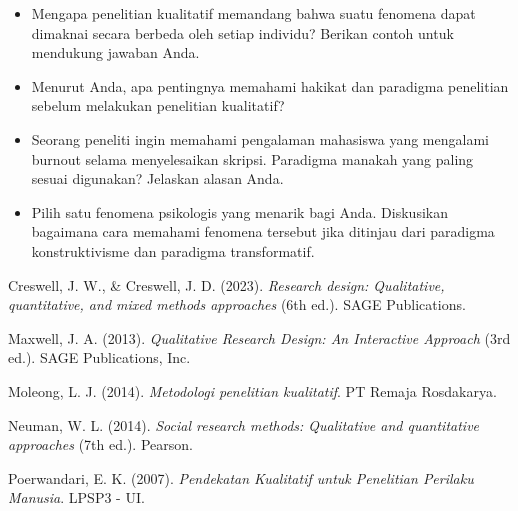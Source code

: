 \documentclass[
  indonesian,
  letterpaper,
  DIV=11,
  numbers=noendperiod]{scrreprt}
\newlength{\cslhangindent}
\newenvironment{CSLReferences}[2] %
 {\begin{list}{}{%
  \setlength{\itemindent}{0pt}
  \setlength{\leftmargin}{0pt}
  \setlength{\parsep}{0pt}
  \ifodd #1
   \setlength{\leftmargin}{\cslhangindent}
   \setlength{\itemindent}{-1\cslhangindent}
  \fi
  \setlength{\itemsep}{#2\baselineskip}}}
 {\end{list}}
\providecommand{\tightlist}{%
  \setlength{\itemsep}{0pt}\setlength{\parskip}{0pt}}
\begin{document}
\begin{tcolorbox}[enhanced jigsaw, colframe=quarto-callout-important-color-frame, toptitle=1mm, breakable, leftrule=.75mm, arc=.35mm, toprule=.15mm, colback=white, colbacktitle=quarto-callout-important-color!10!white, bottomtitle=1mm, bottomrule=.15mm, titlerule=0mm, title=\textcolor{quarto-callout-important-color}{\faExclamation}\hspace{0.5em}{Refleksi \& Diskusi}, coltitle=black, left=2mm, opacitybacktitle=0.6, opacityback=0, rightrule=.15mm]

\begin{itemize}
\tightlist
\item
  Mengapa penelitian kualitatif memandang bahwa suatu fenomena dapat
  dimaknai secara berbeda oleh setiap individu? Berikan contoh untuk
  mendukung jawaban Anda.
\item
  Menurut Anda, apa pentingnya memahami hakikat dan paradigma penelitian
  sebelum melakukan penelitian kualitatif?
\item
  Seorang peneliti ingin memahami pengalaman mahasiswa yang mengalami
  burnout selama menyelesaikan skripsi. Paradigma manakah yang paling
  sesuai digunakan? Jelaskan alasan Anda.
\item
  Pilih satu fenomena psikologis yang menarik bagi Anda. Diskusikan
  bagaimana cara memahami fenomena tersebut jika ditinjau dari paradigma
  konstruktivisme dan paradigma transformatif.
\end{itemize}

\end{tcolorbox}

\label{refs--16}
\begin{CSLReferences}{1}{0}
Creswell, J. W., \& Creswell, J. D. (2023). \emph{Research design:
Qualitative, quantitative, and mixed methods approaches} (6th ed.). SAGE
Publications.

Maxwell, J. A. (2013). \emph{Qualitative Research Design: An Interactive
Approach} (3rd ed.). SAGE Publications, Inc.

Moleong, L. J. (2014). \emph{Metodologi penelitian kualitatif}. PT
Remaja Rosdakarya.

Neuman, W. L. (2014). \emph{Social research methods: Qualitative and
quantitative approaches} (7th ed.). Pearson.

Poerwandari, E. K. (2007). \emph{Pendekatan Kualitatif untuk Penelitian
Perilaku Manusia}. LPSP3 - UI.

\end{CSLReferences}
\end{document}

